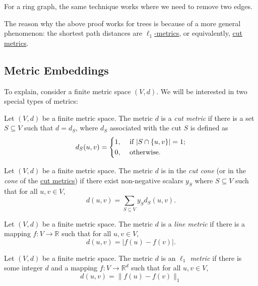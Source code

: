 \begin{eg}[Ring]
	For a ring graph, the same technique works where we need to remove two edges.
\end{eg}

The reason why the above proof works for trees is because of a more general phenomenon: the shortest path distances are \hyperref[def:l1-metric]{\(\ell _1\)-metrics}, or equivalently, \hyperref[def:cut-metric]{cut metrics}.

\subsection{Metric Embeddings}
To explain, consider a finite metric space \((V, d)\). We will be interested in two special types of metrics:

\begin{definition}\label{def:cut-metric}
	Let \((V, d)\) be a finite metric space. The metric \(d\) is a \emph{cut metric} if there is a set \(S \subseteq V\) such that \(d = d_S\), where \(d_S\) associated with the cut \(S\) is defined as
	\[
		d_S(u, v)
		= \begin{dcases}
			1, & \text{ if } \lvert S \cap \{ u, v \}  \rvert = 1 ; \\
			0, & \text{ otherwise} .
		\end{dcases}
	\]
\end{definition}

\begin{definition}\label{def:cut-cone}
	Let \((V, d)\) be a finite metric space. The metric \(d\) is in the \emph{cut cone} (or in the \emph{cone} of the \hyperref[def:cut-metric]{cut metrics}) if there exist non-negative scalars \(y_S\) where \(S \subseteq V\) such that for all \(u, v \in V\),
	\[
		d(u, v)
		= \sum_{S \subseteq V} y_S d_S(u, v).
	\]
\end{definition}

\begin{definition}\label{def:line-metric}
	Let \((V, d)\) be a finite metric space. The metric \(d\) is a \emph{line metric} if there is a mapping \(f \colon V \to \mathbb{R} \) such that for all \(u, v \in V\),
	\[
		d(u, v)
		= \lvert f(u) - f(v) \rvert .
	\]
\end{definition}

\begin{definition}\label{def:l1-metric}
	Let \((V, d)\) be a finite metric space. The metric \(d\) is an \emph{\(\ell _1\) metric} if there is some integer \(d\) and a mapping \(f \colon V \to \mathbb{R} ^d\) such that for all \(u, v \in V\),
	\[
		d(u, v)
		= \lVert f(u) - f(v) \rVert _1
	\]
\end{definition}

